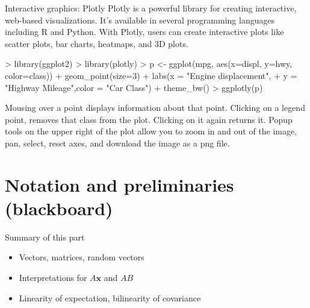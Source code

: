 \documentclass[11pt,handout,aspectratio=169]{beamer}
\begin{document}
\begin{frame}[fragile]{Interactive graphics: Plotly}
Plotly is a powerful library for creating interactive, web-based visualizations. It's available in several programming languages including R and Python. With Plotly, users can create interactive plots like scatter plots, bar charts, heatmaps, and 3D plots.
\begin{Schunk}
\begin{Sinput}
> library(ggplot2)
> library(plotly)
> p <- ggplot(mpg, aes(x=displ, y=hwy, color=class)) + geom_point(size=3) + labs(x = "Engine displacement",
+ y = "Highway Mileage",color = "Car Class") + theme_bw()
> ggplotly(p)
\end{Sinput}
\end{Schunk}
Mousing over a point displays information about that point. Clicking on a
legend point, removes that class from the plot. Clicking on it again returns it.
Popup tools on the upper right of the plot allow you to zoom in and out of
the image, pan, select, reset axes, and download the image as a png file.
\end{frame}

\section{Notation and preliminaries (blackboard)}

\begin{frame}{Summary of this part}
	\begin{itemize}
		\item Vectors, matrices, random vectors
		\item Interpretations for $A\mathbf x$ and $AB$
		\item Linearity of expectation, bilinearity of covariance
	\end{itemize}
\end{frame}
\end{document}
